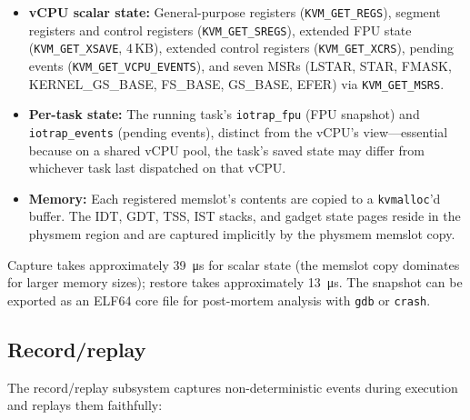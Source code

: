 \begin{itemize}
  \item \textbf{vCPU scalar state:}
    General-purpose registers (\texttt{KVM\_GET\_REGS}), segment registers
    and control registers (\texttt{KVM\_GET\_SREGS}), extended FPU state
    (\texttt{KVM\_GET\_XSAVE}, 4\,KB), extended control registers
    (\texttt{KVM\_GET\_XCRS}), pending events (\texttt{KVM\_GET\_VCPU\_EVENTS}),
    and seven MSRs (LSTAR, STAR, FMASK, KERNEL\_GS\_BASE, FS\_BASE,
    GS\_BASE, EFER) via \texttt{KVM\_GET\_MSRS}.

  \item \textbf{Per-task state:}
    The running task's \texttt{iotrap\_fpu} (FPU snapshot) and
    \texttt{iotrap\_events} (pending events), distinct from the vCPU's
    view---essential because on a shared vCPU pool, the task's saved state
    may differ from whichever task last dispatched on that vCPU.

  \item \textbf{Memory:}
    Each registered memslot's contents are copied to a \texttt{kvmalloc}'d
    buffer.  The IDT, GDT, TSS, IST stacks, and gadget state pages reside
    in the physmem region and are captured implicitly by the physmem memslot
    copy.
\end{itemize}

\noindent
Capture takes approximately \SI{39}{\micro\second} for scalar state (the
memslot copy dominates for larger memory sizes); restore takes approximately
\SI{13}{\micro\second}.  The snapshot can be exported as an ELF64 core file
for post-mortem analysis with \texttt{gdb} or \texttt{crash}.

\subsection{Record/replay}

The record/replay subsystem captures non-deterministic events during
execution and replays them faithfully:

